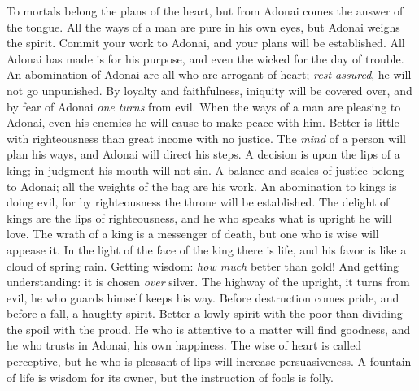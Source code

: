 \begin{biblechapter} %
\verse To mortals belong the plans of the heart, 
but from Adonai comes the answer of the tongue.
\verse All the ways of a man are pure in his own eyes, 
but Adonai weighs the spirit.
\verse Commit your work to Adonai, 
and your plans will be established.
\verse All Adonai has made is for his purpose, 
and even the wicked for the day of trouble.
\verse An abomination of Adonai are all who are arrogant of heart; 
\textit{rest assured}, he will not go unpunished.
\verse By loyalty and faithfulness, iniquity will be covered over, 
and by fear of Adonai \textit{one turns} from evil.
\verse When the ways of a man are pleasing to Adonai, 
even his enemies he will cause to make peace with him.
\verse Better is little with righteousness 
than great income with no justice.
\verse The \textit{mind} of a person will plan his ways, 
and Adonai will direct his steps.
\verse A decision is upon the lips of a king; 
in judgment his mouth will not sin.
\verse A balance and scales of justice belong to Adonai; 
all the weights of the bag are his work.
\verse An abomination to kings is doing evil, 
for by righteousness the throne will be established.
\verse The delight of kings are the lips of righteousness, 
and he who speaks what is upright he will love.
\verse The wrath of a king is a messenger of death, 
but one who is wise will appease it.
\verse In the light of the face of the king there is life, 
and his favor is like a cloud of spring rain.
\verse Getting wisdom: \textit{how much} better than gold! 
And getting understanding: it is chosen \textit{over} silver.
\verse The highway of the upright, it turns from evil, 
he who guards himself keeps his way.
\verse Before destruction comes pride, 
and before a fall, a haughty spirit.
\verse Better a lowly spirit with the poor 
than dividing the spoil with the proud.
\verse He who is attentive to a matter will find goodness, 
and he who trusts in Adonai, his own happiness.
\verse The wise of heart is called perceptive, 
but he who is pleasant of lips will increase persuasiveness.
\verse A fountain of life is wisdom for its owner, 
but the instruction of fools is folly.

\end{biblechapter}
